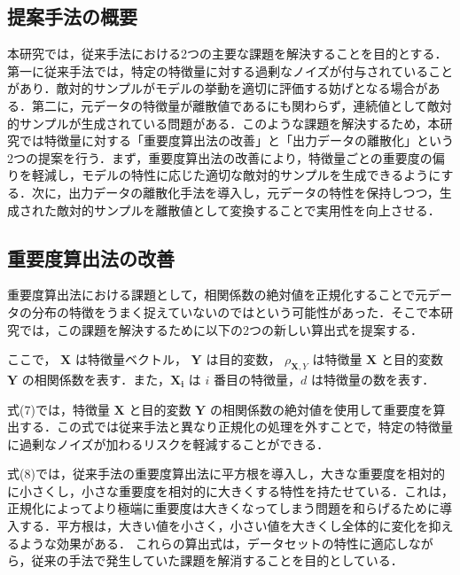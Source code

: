\subsection{提案手法の概要}
本研究では，従来手法における2つの主要な課題を解決することを目的とする．第一に従来手法では，特定の特徴量に対する過剰なノイズが付与されていることがあり．敵対的サンプルがモデルの挙動を適切に評価する妨げとなる場合がある．第二に，元データの特徴量が離散値であるにも関わらず，連続値として敵対的サンプルが生成されている問題がある．このような課題を解決するため，本研究では特徴量に対する「重要度算出法の改善」と「出力データの離散化」という2つの提案を行う．まず，重要度算出法の改善により，特徴量ごとの重要度の偏りを軽減し，モデルの特性に応じた適切な敵対的サンプルを生成できるようにする．次に，出力データの離散化手法を導入し，元データの特性を保持しつつ，生成された敵対的サンプルを離散値として変換することで実用性を向上させる．

\subsection{重要度算出法の改善}
重要度算出法における課題として，相関係数の絶対値を正規化することで元データの分布の特徴をうまく捉えていないのではという可能性があった．そこで本研究では，この課題を解決するために以下の2つの新しい算出式を提案する．


ここで， $\bm{X}$ は特徴量ベクトル， $\bm{Y}$ は目的変数， $\rho_{\bm{X},Y}$ は特徴量 $\bm{X}$ と目的変数 $\bm{Y}$ の相関係数を表す．また，$\bm{X_i}$ は $i$ 番目の特徴量，$d$ は特徴量の数を表す．

式(7)では，特徴量 $\bm{X}$ と目的変数 $\bm{Y}$ の相関係数の絶対値を使用して重要度を算出する．この式では従来手法と異なり正規化の処理を外すことで，特定の特徴量に過剰なノイズが加わるリスクを軽減することができる．

式(8)では，従来手法の重要度算出法に平方根を導入し，大きな重要度を相対的に小さくし，小さな重要度を相対的に大きくする特性を持たせている．これは，正規化によってより極端に重要度は大きくなってしまう問題を和らげるために導入する．平方根は，大きい値を小さく，小さい値を大きくし全体的に変化を抑えるような効果がある．
これらの算出式は，データセットの特性に適応しながら，従来の手法で発生していた課題を解消することを目的としている．

